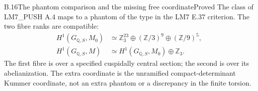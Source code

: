 \begin{statement}{B.16}{The phantom comparison and the missing free coordinate}{Proved}
The class of LM7\_PUSH A.4 maps to a phantom of the type in the
LM7 E.37 criterion. The two fibre ranks are compatible:
\[
\begin{aligned}
 H^1(G_{\mathbb Q,S},M_0)
    &\simeq\mathbb Z_3^{23}\oplus(\mathbb Z/3)^9
                            \oplus(\mathbb Z/9)^5,\\
 H^1(G_{\mathbb Q,S},M)
    &\simeq H^1(G_{\mathbb Q,S},M_0)\oplus\mathbb Z_3.
\end{aligned}                                                     \tag{B.16.1}
\]
The first fibre is over a specified cuspidally central section;
the second is over its abelianization. The extra coordinate is
the unramified compact-determinant Kummer coordinate, not an
extra phantom or a discrepancy in the finite torsion.
\end{statement}
